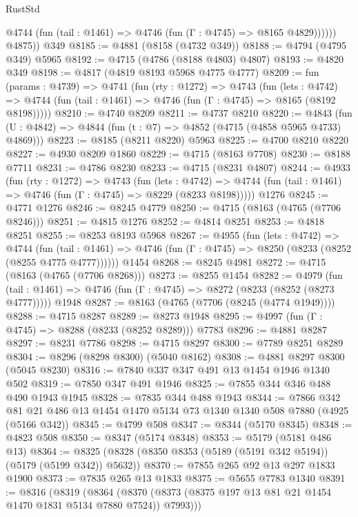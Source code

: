 \begin{lexlean}{RustStd}
\begin{coremodule}
              @4744 (fun (tail : @1461) => @4746 (fun (Γ : @4745) => @8165 @4829))))))
        @4875))
    @349
@8185 := @4881 (@8158 (@4732 @349))
@8188 := @4794 (@4795 @349) @5965
@8192 := @4715 (@4786 (@8188 @4803) @4807)
@8193 := @4820 @349
@8198 := @4817 (@4819 @8193 @5968 @4775 @4777)
@8209 := fun (params : @4739) =>
  @4741
    (fun (rty : @1272) =>
    @4743
      (fun (lets : @4742) =>
      @4744 (fun (tail : @1461) => @4746 (fun (Γ : @4745) => @8165 (@8192 @8198)))))
@8210 := @4740 @8209
@8211 := @4737 @8210
@8220 := @4843 (fun (U : @4842) => @4844 (fun (t : @7) => @4852 (@4715 (@4858 @5965 @4733) @4869)))
@8223 := @8185 (@8211 @8220) @5963
@8225 := @4700 @8210 @8220
@8227 := @4930 @8209 @1860
@8229 := @4715 (@8163 @7708)
@8230 := @8188 @7711
@8231 := @4786 @8230
@8233 := @4715 (@8231 @4807)
@8244 := @4933
    (fun (rty : @1272) =>
    @4743
      (fun (lets : @4742) =>
      @4744 (fun (tail : @1461) => @4746 (fun (Γ : @4745) => @8229 (@8233 @8198)))))
    @1276
@8245 := @4771 @1276
@8246 := @8245 @4779
@8250 := @4715 (@8163 (@4765 (@7706 @8246)))
@8251 := @4815 @1276
@8252 := @4814 @8251
@8253 := @4818 @8251
@8255 := @8253 @8193 @5968
@8267 := @4955
    (fun (lets : @4742) =>
    @4744
      (fun (tail : @1461) => @4746 (fun (Γ : @4745) => @8250 (@8233 (@8252 (@8255 @4775 @4777))))))
    @1454
@8268 := @8245 @4981
@8272 := @4715 (@8163 (@4765 (@7706 @8268)))
@8273 := @8255 @1454
@8282 := @4979
    (fun (tail : @1461) => @4746 (fun (Γ : @4745) => @8272 (@8233 (@8252 (@8273 @4777)))))
    @1948
@8287 := @8163 (@4765 (@7706 (@8245 (@4774 @1949))))
@8288 := @4715 @8287
@8289 := @8273 @1948
@8295 := @4997 (fun (Γ : @4745) => @8288 (@8233 (@8252 @8289))) @7783
@8296 := @4881 @8287
@8297 := @8231 @7786
@8298 := @4715 @8297
@8300 := @7789 @8251 @8289
@8304 := @8296 (@8298 @8300) (@5040 @8162)
@8308 := @4881 @8297 @8300 (@5045 @8230)
@8316 := @7840 @337 @347 @491 @13 @1454 @1946 @1340 @502
@8319 := @7850 @347 @491 @1946
@8325 := @7855 @344 @346 @488 @490 @1943 @1945
@8328 := @7835 @344 @488 @1943
@8344 := @7866
    @342
    @81
    @21
    @486
    @13
    @1454
    @1470
    @5134
    @73
    @1340
    @1340
    @508
    @7880
    (@4925 (@5166 @342))
@8345 := @4799 @508
@8347 := @8344 (@5170 @8345)
@8348 := @4823 @508
@8350 := @8347 (@5174 @8348)
@8353 := @5179 (@5181 @486 @13)
@8364 := @8325 (@8328 (@8350 @8353 (@5189 (@5191 @342 @5194)) (@5179 (@5199 @342)) @5632))
@8370 := @7855 @265 @92 @13 @297 @1833 @1900
@8373 := @7835 @265 @13 @1833
@8375 := @5655 @7783 @1340
@8391 := @8316
    (@8319
      (@8364 (@8370 (@8373 (@8375 @197 @13 @81 @21 @1454 @1470 @1831 @5134 @7880 @7524)) @7993)))

\end{coremodule}
\end{lexlean}
